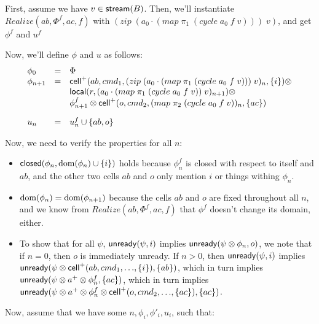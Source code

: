 \documentclass{article}
\begin{document}
First, assume we have $v \in \mbox{\textsf{{stream}}}({B})$. Then, we'll instantiate $Realize(ab, \Phi^f, ac, f)$ with $(zip\;(a_0\cdot(map\;\pi_1\;(cycle\;a_0\;f\;v)))\;v)$, and get $\phi^f$ and $u^f$

Now, we'll define $\phi$ and $u$ as follows: 
\begin{displaymath}
  \begin{array}{lcl}
    \phi_0 & = & \Phi \\
    \phi_{n+1} & = & \mbox{\textsf{{cell}}}^{+}({ab}, {cmd_1}, {(zip\;(a_0\cdot(map\;\pi_1\;(cycle\;a_0\;f\;v)))\;v)_n}, {\{{i}\}}) \otimes \\
               & &   \mbox{\textsf{{local}}}({r}, {(a_0\cdot(map\;\pi_1\;(cycle\;a_0\;f\;v))\;v)_{n+1}}) \otimes \\
               & &   \phi^f_{n+1} \otimes 
                     \mbox{\textsf{{cell}}}^{+}({o}, {cmd_2}, {(map\;\pi_2\;(cycle\;a_0\;f\;v))_n}, {\{{ac}\}}) \\[1em]

    u_n & = & u^f_n \cup \{{ab, o}\} \\
  \end{array}
\end{displaymath}

Now, we need to verify the properties for all $n$: 
\begin{itemize}
\item $\mbox{\textsf{{closed}}}({\phi_n}, {\mbox{dom}({\phi_n}) \cup \{{i}\}})$ holds because $\phi^f_n$ is closed with
respect to itself and $ab$, and the other two cells $ab$ and $o$ only mention $i$ or things
withing $\phi_n$. 

\item $\mbox{dom}({\phi_n}) = \mbox{dom}({\phi_{n+1}})$ because the cells $ab$ and $o$ are fixed
throughout all $n$, and we know from $Realize(ab, \Phi^f, ac, f)$ that $\phi^f$ doesn't
change its domain, either. 

\item To show that for all $\psi$, $\mbox{\textsf{{unready}}}({\psi}, {i})$ implies $\mbox{\textsf{{unready}}}({\psi \otimes \phi_n}, {o})$, 
we note that if $n = 0$, then $o$ is immediately unready. If $n > 0$, then $\mbox{\textsf{{unready}}}({\psi}, {i})$ implies $\mbox{\textsf{{unready}}}({\psi \otimes \mbox{\textsf{{cell}}}^{+}({ab}, {cmd_1}, {\ldots}, {\{{i}\}})}, {\{{ab}\}})$, which in turn
implies \\ $\mbox{\textsf{{unready}}}({\psi \otimes a^+ \otimes \phi^f_n}, {\{{ac}\}})$, which in turn implies \\$\mbox{\textsf{{unready}}}({\psi \otimes a^+ \otimes \phi^f_n \otimes \mbox{\textsf{{cell}}}^{+}({o}, {cmd_2}, {\ldots}, {\{{ac}\}})}, {\{{ac}\}})$.
\end{itemize}

Now, assume that we have some $n, \phi_i, \phi'_i, u_i$, such that: 
\end{document}
